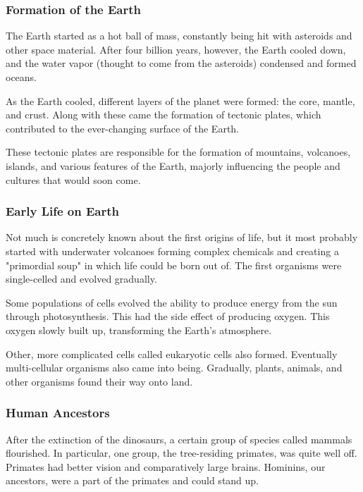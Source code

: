 \documentclass[11pt]{article}
\begin{document}
\subsubsection{Formation of the Earth}
\label{sec:orgb78d380}

The Earth started as a hot ball of mass, constantly being hit with asteroids and other space material. After four billion years, however, the Earth cooled down, and the water vapor (thought to come from the asteroids) condensed and formed oceans.

As the Earth cooled, different layers of the planet were formed: the core, mantle, and crust. Along with these came the formation of tectonic plates, which contributed to the ever-changing surface of the Earth.

These tectonic plates are responsible for the formation of mountains, volcanoes, islands, and various features of the Earth, majorly influencing the people and cultures that would soon come.

\subsubsection{Early Life on Earth}
\label{sec:org58088b6}

Not much is concretely known about the first origins of life, but it most probably started with underwater volcanoes forming complex chemicals and creating a "primordial soup" in which life could be born out of. The first organisms were single-celled and evolved gradually.

Some populations of cells evolved the ability to produce energy from the sun through photosynthesis. This had the side effect of producing oxygen. This oxygen slowly built up, transforming the Earth's atmosphere.

Other, more complicated cells called eukaryotic cells also formed. Eventually multi-cellular organisms also came into being. Gradually, plants, animals, and other organisms found their way onto land.

\subsubsection{Human Ancestors}
\label{sec:orgddc80f4}

After the extinction of the dinosaurs, a certain group of species called mammals flourished. In particular, one group, the tree-residing primates, was quite well off. Primates had better vision and comparatively large brains. Hominins, our ancestors, were a part of the primates and could stand up.
\end{document}
